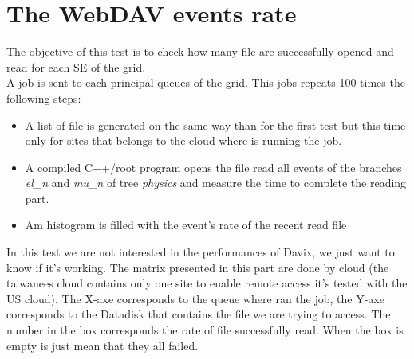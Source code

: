 \section{The WebDAV events rate}

The objective of this test is to check how many file are successfully opened and read for each SE of the grid.\\

A job is sent to each principal queues of the grid. This jobs repeats 100 times the following steps:
\begin{itemize}
        \item A list of file is generated on the same way than for the first test but this time only for sites that belongs to the cloud where is running the job.
        \item A compiled C++/root program opens the file read all events of the branches \textit{el\_n} and \textit{mu\_n} of tree \textit{physics} and measure the time to complete the reading part.
        \item Am histogram is filled with the event's rate of the recent read file
\end{itemize}

In this test we are not interested in the performances of Davix, we just want to know if it's working. The matrix presented in this part are done by cloud (the taiwanees cloud contains only one site to enable remote access it's tested with the US cloud). The X-axe corresponds to the queue where ran the job, the Y-axe corresponds to the Datadisk that contains the file we are trying to access. The number in the box corresponds the rate of file successfully read. When the box is empty is just mean that they all failed. 
\vspace{1ex}

\vspace{1ex}
